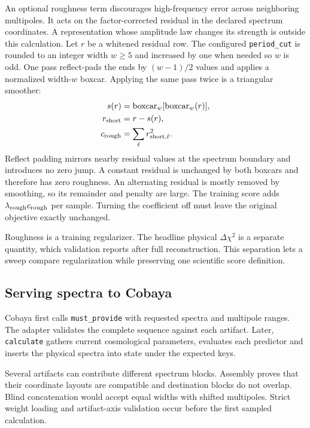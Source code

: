 \documentclass[10pt,aps,prd,twocolumn,nofootinbib]{revtex4-2}
\newcommand{\code}[1]{\texttt{#1}}
\begin{document}
An optional roughness term discourages high-frequency error across neighboring
multipoles.  It acts on the factor-corrected residual in the declared spectrum
coordinates.  A representation whose amplitude law changes its strength is
outside this calculation.  Let $r$ be a whitened residual row.  The configured
\code{period\_cut} is rounded to an integer width $w\ge5$ and increased by one
when needed so $w$ is odd.  One pass reflect-pads the ends by $(w-1)/2$ values
and applies a normalized width-$w$ boxcar.  Applying the same pass twice is a
triangular smoother:
\begin{align*}
 s(r)&=\operatorname{boxcar}_w
       [\operatorname{boxcar}_w(r)],\\
 r_{\rm short}&=r-s(r),\\
 c_{\rm rough}&=\sum_\ell r_{{\rm short},\ell}^2.
\end{align*}
Reflect padding mirrors nearby residual values at the spectrum boundary and
introduces no zero jump.  A constant residual is unchanged by both
boxcars and therefore has zero roughness.  An alternating residual is mostly
removed by smoothing, so its remainder and penalty are large.  The training
score adds $\lambda_{\rm rough}c_{\rm rough}$ per sample.  Turning the
coefficient off must leave the original objective exactly unchanged.

Roughness is a training regularizer.  The headline physical \(\Delta\chi^2\)
is a separate quantity, which validation reports after full reconstruction.
This separation lets a sweep compare regularization while preserving one
scientific score definition.

\subsection{Serving spectra to Cobaya}

Cobaya first calls \code{must\_provide} with requested spectra and multipole
ranges.  The adapter validates the complete sequence against each artifact.
Later, \code{calculate} gathers current cosmological parameters, evaluates
each predictor and inserts the physical spectra into state under the expected
keys.

Several artifacts can contribute different spectrum blocks.  Assembly proves
that their coordinate layouts are compatible and destination blocks do not
overlap.  Blind concatenation would accept equal widths with shifted
multipoles.  Strict weight loading and artifact-axis validation occur before
the first sampled calculation.
\end{document}
